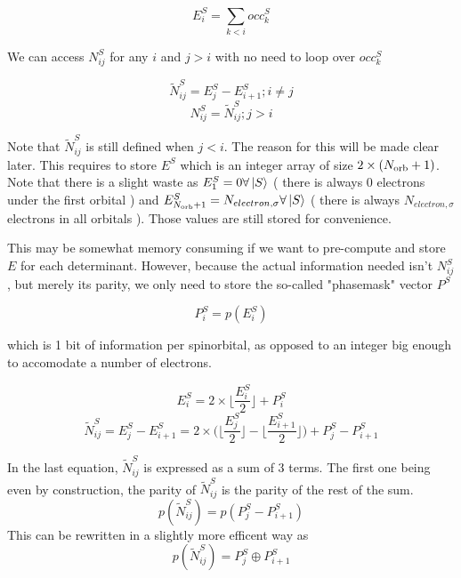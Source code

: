 \documentclass[./thesis.tex]{subfiles}
\begin{document}
$$E^S_{i} = \sum_{k < i} occ^{S}_{k}$$
        
We can access $N^S_{ij}$ for any $i$ and $j>i$ with no need to loop over $occ^{S}_{k}$

$$\tilde N^S_{ij} = E^S_j - E^S_{i+1} ; i \neq j$$
$$N^S_{ij} = \tilde N^S_{ij} ; j>i$$

Note that $\tilde N^S_{ij}$ is still defined when $j<i$. The reason for this will be made clear later.
This requires to store $E^S$ which is an integer array of size $2 \times ({N_\text{orb}}+1)$. Note that there is a slight waste as $E^S_1 = 0 \forall \ket S$ ( there is always $0$ electrons under the first orbital ) and $E^S_{{N_\text{orb}}+1} = N_{electron,\sigma} \forall \ket S$ ( there is always $N_{electron,\sigma}$ electrons in all orbitals ). Those values are still stored for convenience.

This may be somewhat memory consuming if we want to pre-compute and store $E$ for each determinant. However, because the actual information needed isn't $N^S_{ij}$, but merely its parity, we only need to store the so-called "phasemask" vector $P^S$

$$P^S_i = p(E^S_i)$$

which is 1 bit of information per spinorbital, as opposed to an integer big enough to accomodate a number of electrons.
       
$$E^S_i = 2 \times  \lfloor \frac{E^S_i}2 \rfloor + P^S_i$$
$$\tilde N^S_{ij} = E^S_j - E^S_{i+1} = 2 \times \big ( \lfloor \frac{E^S_j}2 \rfloor - \lfloor \frac{E^S_{i+1}}2 \rfloor \big ) + P^S_j - P^S_{i+1}$$
	    
In the last equation, $\tilde N^S_{ij}$ is expressed as a sum of 3 terms. The first one being even by construction, the parity of $\tilde N^S_{ij}$ is the parity of the rest of the sum.
$$p(\tilde N^S_{ij})=p(P^S_j - P^S_{i+1})$$
This can be rewritten in a slightly more efficent way as
$$p(\tilde N^S_{ij}) = P^S_j \oplus P^S_{i+1}$$
\end{document}
